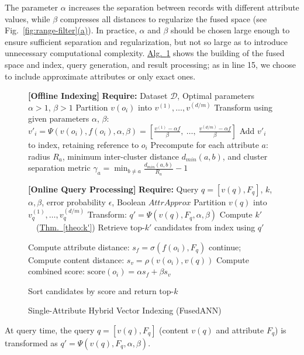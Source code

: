 \documentclass[numbers,sort]{article}
\begin{document}
The parameter $\alpha$ increases the separation between records with different attribute values, while $\beta$ compresses all distances to regularize the fused space (see Fig.~\hyperref[fig:range-filter]{\ref*{fig:range-filter}(a)}). In practice, $\alpha$ and $\beta$ should be chosen large enough to ensure sufficient separation and regularization, but not so large as to introduce unnecessary computational complexity. \hyperref[alg:main]{Alg.~\ref*{alg:main}} shows the building of the fused space and index, query generation, and result processing; as in line 15, we choose to include approximate attributes or only exact ones.\begin{figure}
  \vspace{-10pt}
  \begin{minipage}{0.58\textwidth}
\begin{algorithm}[H]
\small
\caption{Single-Attribute Hybrid Vector Indexing (FusedANN)}
\begin{algorithmic}[1]
\STATE \textbf{[Offline Indexing]} \textbf{Require:} Dataset $\mathcal{D}$, Optimal parameters $\alpha > 1$, $\beta > 1$
    \STATE Partition $v(o_i)$ into $v^{(1)},\ldots,v^{(d/m)}$
    \STATE Transform using given parameters $\alpha$, $\beta$: $v'_i = \Psi(v(o_i), f(o_i), \alpha, \beta) = \left[\frac{v^{(1)} - \alpha f}{\beta},~\ldots,~\frac{v^{(d/m)} - \alpha f}{\beta}\right]$
    \STATE Add $v'_i$ to index, retaining reference to $o_i$
\ENDFOR
\STATE Precompute for each attribute $a$: radius $R_a$, minimum inter-cluster distance $d_{min}(a,b)$, and cluster separation metric $\gamma_a = \min_{b \neq a} \frac{d_{min}(a,b)}{R_a} - 1$

\STATE \textbf{[Online Query Processing]} \textbf{Require:} Query $q = [v(q), F_q]$, $k$, $\alpha, \beta$, error probability $\epsilon$, Boolean $AttrApprox$
\STATE Partition $v(q)$ into $v_q^{(1)},\ldots,v_q^{(d/m)}$
\STATE Transform: $q' = \Psi(v(q), F_q, \alpha, \beta)$
\STATE Compute $k'$~~(\hyperref[theo:k']{Thm.~\ref*{theo:k'}})
\STATE Retrieve top-$k'$ candidates from index using $q'$

    \STATE Compute attribute distance: $s_f = \sigma(f(o_i), F_q)$
     \STATE continue; 
\ENDIF
    \STATE Compute content distance: $s_v = \rho(v(o_i), v(q))$
    \STATE Compute combined score: $\text{score}(o_i) = \alpha s_f + \beta s_v$
\ENDFOR

\STATE Sort candidates by score and return top-$k$
\end{algorithmic}
\label{alg:main}
\end{algorithm}
  \end{minipage}
  \vspace{-10pt}
\end{figure} At query time, the query $q = [v(q), F_q]$ (content $v(q)$ and attribute $F_q$) is transformed as $q' = \Psi(v(q), F_q, \alpha, \beta)$. 
\end{document}
